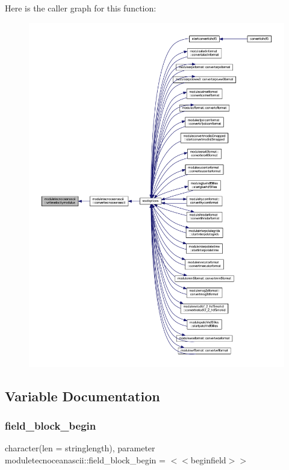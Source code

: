 Here is the caller graph for this function\+:\nopagebreak
\begin{figure}[H]
\begin{center}
\leavevmode
\includegraphics[width=350pt]{namespacemoduletecnoceanascii_aa4e611e7a40208b6cd2a72c6a6ee06f7_icgraph}
\end{center}
\end{figure}


\subsection{Variable Documentation}
\mbox{\label{namespacemoduletecnoceanascii_a6e203357bcc95a95fdbd379800fe67d3}} 
\subsubsection{\texorpdfstring{field\+\_\+block\+\_\+begin}{field\_block\_begin}}
{\footnotesize\ttfamily character(len = stringlength), parameter moduletecnoceanascii\+::field\+\_\+block\+\_\+begin = \textquotesingle{}$<$$<$beginfield$>$$>$\textquotesingle{}\hspace{0.3cm}{\ttfamily [private]}}

